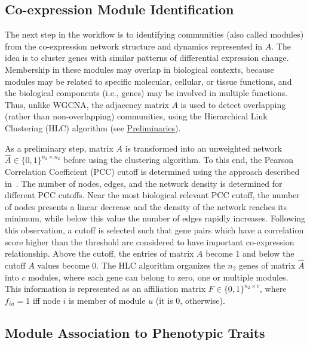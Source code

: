 \documentclass{bmcart}
\begin{document}
\subsection*{Co-expression Module Identification}

The next step in the workflow is to identifying communities (also
called modules) from the co-expression network structure and dynamics
represented in $A$.  The idea is to cluster genes with similar
patterns of differential expression change. Membership in these
modules may overlap in biological contexts, because modules may be
related to specific molecular, cellular, or tissue functions, and the
biological components (i.e., genes) may be involved in multiple
functions. Thus, unlike WGCNA, the adjacency matrix $A$ is used to
detect overlapping (rather than non-overlapping) communities, using
the Hierarchical Link Clustering (HLC) algorithm (see
\hyperref[sec.prelim]{Preliminaries}).
\vspace{0.5cm}

As a preliminary step, matrix $A$ is transformed into an unweighted
network $\hat{A} \in \{0,1\}^{n_2 \times n_2}$ before using the
clustering algorithm. To this end, the Pearson Correlation Coefficient
(PCC) cutoff is determined using the approach described
in~\cite{aoki2007approaches}. The number of nodes, edges, and the
network density is determined for different PCC cutoffs. Near the most
biological relevant PCC cutoff, the number of nodes presents a linear
decrease and the density of the network reaches its minimum, while
below this value the number of edges rapidly increases. Following this
observation, a cutoff is selected such that gene pairs which have a
correlation score higher than the threshold are considered to have
important co-expression relationship. Above the cutoff, the entries of
matrix $A$ become $1$ and below the cutoff $A$ values become $0$. The
HLC algorithm organizes the $n_2$ genes of matrix $\hat{A}$ into $c$
modules, where each gene can belong to zero, one or multiple modules.
This information is represented as an affiliation matrix $F \in
\{0,1\}^{n_2 \times c}$, where $f_{iu} = 1$ iff node $i$ is member of
module $u$ (it is 0, otherwise).

\subsection*{Module Association to Phenotypic Traits}
\end{document}
